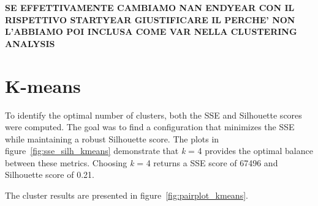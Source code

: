 \textbf{SE EFFETTIVAMENTE CAMBIAMO NAN ENDYEAR CON IL RISPETTIVO STARTYEAR GIUSTIFICARE IL PERCHE' NON L'ABBIAMO POI INCLUSA COME VAR NELLA CLUSTERING ANALYSIS}

\section{K-means}\label{sec:centroid_based}

To identify the optimal number of clusters, both the SSE and Silhouette scores were computed. The goal was to find a configuration that minimizes the SSE while maintaining a robust Silhouette score. 
The plots in figure~\ref{fig:sse_silh_kmeans} demonstrate that \textit{k} = 4 provides the optimal balance between these metrics. Choosing \textit{k} = 4 returns a SSE score of 67496 and Silhouette score of 0.21. 

The cluster results are presented in figure~\ref{fig:pairplot_kmeans}. 

